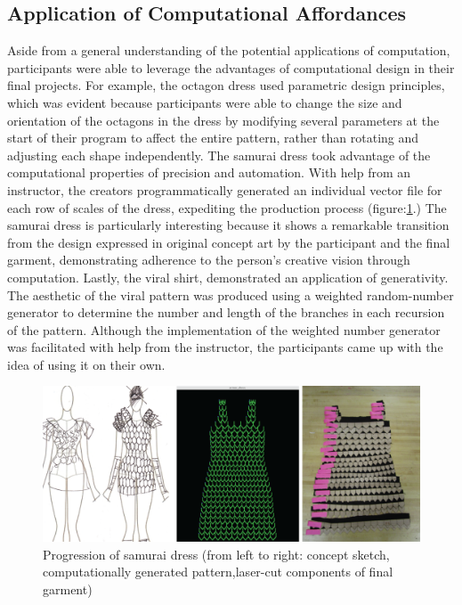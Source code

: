 \subsection{Application of Computational Affordances}
Aside from a general understanding of the potential applications of computation, participants were able to leverage the advantages of computational design in their final projects. For example, the octagon dress used parametric design principles, which was evident because participants were able to change the size and orientation of the octagons in the dress by modifying several parameters at the start of their program to affect the entire pattern, rather than rotating and adjusting each shape independently. The samurai dress took advantage of the computational properties of precision and automation. With help from an instructor, the creators programmatically generated an individual vector file for each row of scales of the dress, expediting the production process (figure:\ref{fig:samurai_dress_progression}.) The samurai dress is particularly interesting because it shows a remarkable  transition from the design expressed in original concept art by the participant and the final garment, demonstrating  adherence to the person's creative vision through computation. Lastly, the viral shirt, demonstrated an application of generativity. The aesthetic of the viral pattern was produced using a weighted random-number generator to determine the number and length of the branches in each recursion of the pattern. Although the implementation of the weighted number generator was facilitated with help from the instructor, the participants came up with the idea of using it on their own.
\begin{center}
\begin{figure}[h!]
\includegraphics[width=6.5in]{images/samurai_dress_progression.png}
\caption{Progression of samurai dress (from left to right: concept sketch, computationally generated pattern,laser-cut components of final garment)}
\label{fig:samurai_dress_progression}
\end{figure}
\end{center}

